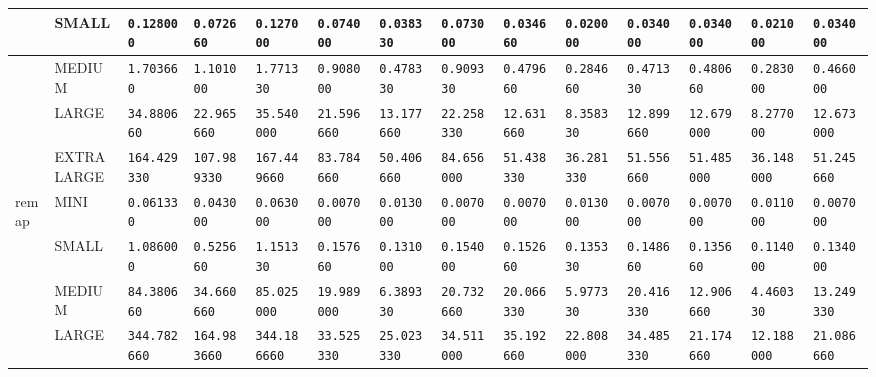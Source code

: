 \begin{tabular}{l | l | l | l | l | l | l | l | l | l | l | l | l | l}
             & SMALL      & \verb|0.128000     | & \verb|0.072660    | & \verb|0.127000    | & \verb|0.074000    | & \verb|0.038330    | & \verb|0.073000    | & \verb|0.034660    | & \verb|0.020000    | & \verb|0.034000    | & \verb|0.034000    | & \verb|0.021000    | & \verb|0.034000    | \\ \hline
             & MEDIUM     & \verb|1.703660     | & \verb|1.101000    | & \verb|1.771330    | & \verb|0.908000    | & \verb|0.478330    | & \verb|0.909330    | & \verb|0.479660    | & \verb|0.284660    | & \verb|0.471330    | & \verb|0.480660    | & \verb|0.283000    | & \verb|0.466000    | \\ \hline
             & LARGE      & \verb|34.880660    | & \verb|22.965660   | & \verb|35.540000   | & \verb|21.596660   | & \verb|13.177660   | & \verb|22.258330   | & \verb|12.631660   | & \verb|8.358330    | & \verb|12.899660   | & \verb|12.679000   | & \verb|8.277000    | & \verb|12.673000   | \\ \hline
             & EXTRALARGE & \verb|164.429330   | & \verb|107.989330  | & \verb|167.449660  | & \verb|83.784660   | & \verb|50.406660   | & \verb|84.656000   | & \verb|51.438330   | & \verb|36.281330   | & \verb|51.556660   | & \verb|51.485000   | & \verb|36.148000   | & \verb|51.245660   | \\ \hline
    remap    & MINI       & \verb|0.061330     | & \verb|0.043000    | & \verb|0.063000    | & \verb|0.007000    | & \verb|0.013000    | & \verb|0.007000    | & \verb|0.007000    | & \verb|0.013000    | & \verb|0.007000    | & \verb|0.007000    | & \verb|0.011000    | & \verb|0.007000    | \\ \hline
             & SMALL      & \verb|1.086000     | & \verb|0.525660    | & \verb|1.151330    | & \verb|0.157660    | & \verb|0.131000    | & \verb|0.154000    | & \verb|0.152660    | & \verb|0.135330    | & \verb|0.148660    | & \verb|0.135660    | & \verb|0.114000    | & \verb|0.134000    | \\ \hline
             & MEDIUM     & \verb|84.380660    | & \verb|34.660660   | & \verb|85.025000   | & \verb|19.989000   | & \verb|6.389330    | & \verb|20.732660   | & \verb|20.066330   | & \verb|5.977330    | & \verb|20.416330   | & \verb|12.906660   | & \verb|4.460330    | & \verb|13.249330   | \\ \hline
             & LARGE      & \verb|344.782660   | & \verb|164.983660  | & \verb|344.186660  | & \verb|33.525330   | & \verb|25.023330   | & \verb|34.511000   | & \verb|35.192660   | & \verb|22.808000   | & \verb|34.485330   | & \verb|21.174660   | & \verb|12.188000   | & \verb|21.086660   | \\ \hline

\end{tabular}
